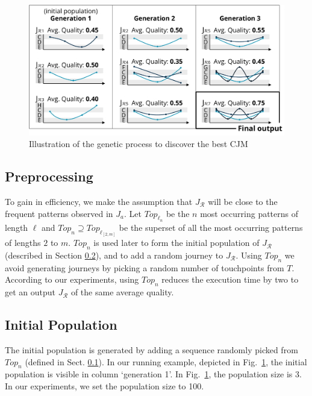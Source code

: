 \documentclass[runningheads]{llncs}
\begin{document}
{\begin{figure}
\centering
\includegraphics[width=0.7\columnwidth]{05_schema/intuition2.pdf}
  \caption{Illustration of the genetic process to discover the best CJM}
  \label{fig:intuition2}
\end{figure}

\subsection{Preprocessing} \label{preprocessing}
To gain in efficiency, we make the assumption that $J_{\mathcal{R}}$ will be close to the frequent patterns observed in $J_{a}$. Let $Top_{\ell_n}$ be the $n$ most occurring patterns of length $\ell$ and $Top_n \supseteq Top_{\ell_{[2,m]}}$ be the superset of all the most occurring patterns of lengths $2$ to $m$.  $Top_n$ is used later to form the initial population of $J_{\mathcal{R}}$ (described in Section \ref{chap:initial-population}), and to add a random journey to $J_{\mathcal{R}}$. Using $Top_n$ we avoid generating journeys by picking a random number of touchpoints from $T$. According to our experiments, using $Top_n$ reduces the execution time by two to get an output $J_{\mathcal{R}}$ of the same average quality.

\subsection{Initial Population}
\label{chap:initial-population}
The initial population is generated by adding a sequence randomly picked from $Top_n$ {(defined in Sect. \ref{preprocessing})}. In our running example, depicted in Fig.~\ref{fig:intuition2}, the initial population is visible in column `generation 1'. In Fig.~\ref{fig:intuition2}, the population size is 3. In our experiments, we set the population size to 100. 

}
\end{document}
